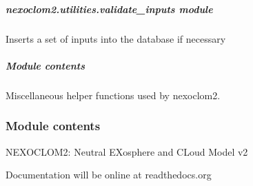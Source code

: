 \documentclass[letterpaper,10pt,english]{sphinxmanual}
\begin{document}
\sphinxstepscope


\subparagraph{nexoclom2.utilities.validate\_inputs module}
\label{\detokenize{nexoclom2/nexoclom2.utilities.validate_inputs:module-nexoclom2.utilities.validate_inputs}}\label{\detokenize{nexoclom2/nexoclom2.utilities.validate_inputs:nexoclom2-utilities-validate-inputs-module}}\label{\detokenize{nexoclom2/nexoclom2.utilities.validate_inputs::doc}}

\begin{fulllineitems}
\label{\detokenize{nexoclom2/nexoclom2.utilities.validate_inputs:nexoclom2.utilities.validate_inputs.validate_inputs}}
\pysigstartsignatures
\pysiglinewithargsret
{}
{}
{}
\pysigstopsignatures
\sphinxAtStartPar
Inserts a set of inputs into the database if necessary

\end{fulllineitems}



\subparagraph{Module contents}
\label{\detokenize{nexoclom2/nexoclom2.utilities:module-nexoclom2.utilities}}\label{\detokenize{nexoclom2/nexoclom2.utilities:module-contents}}
\sphinxAtStartPar
Miscellaneous helper functions used by nexoclom2.


\subsubsection{Module contents}
\label{\detokenize{nexoclom2/nexoclom2:module-nexoclom2}}\label{\detokenize{nexoclom2/nexoclom2:module-contents}}
\sphinxAtStartPar
NEXOCLOM2: Neutral EXosphere and CLoud Model v2

\sphinxAtStartPar
Documentation will be online at readthedocs.org
\end{document}
